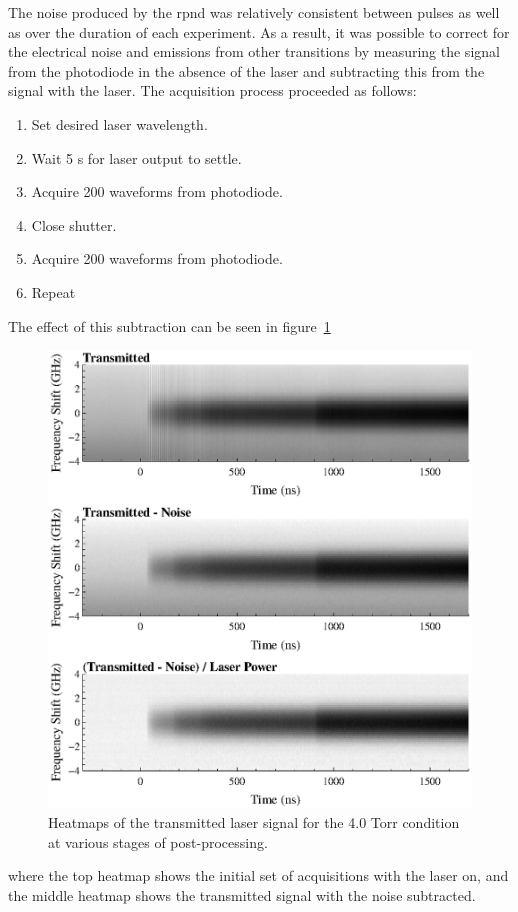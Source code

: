 The noise produced by the \acs{rpnd} was relatively consistent between pulses as
well as over the duration of each experiment. As a result, it was possible to
correct for the electrical noise and emissions from other transitions by
measuring the signal from the photodiode in the absence of the laser and
subtracting this from the signal with the laser. The acquisition process
proceeded as follows:
\begin{enumerate}
  \item Set desired laser wavelength.
  \item Wait 5 s for laser output to settle.
  \item Acquire 200 waveforms from photodiode.
  \item Close shutter.
  \item Acquire 200 waveforms from photodiode.
  \item Repeat
\end{enumerate}
The effect of this subtraction can be seen in figure~\ref{fig:contours}
\begin{figure}
  \centering
  \includegraphics{./chapters/metastables/figures/contours.eps}
  \caption{Heatmaps of the transmitted laser signal for the 4.0 Torr condition at 
  various stages of post-processing.}
  \label{fig:contours}
\end{figure}
where the top heatmap shows the initial set of acquisitions with the laser on,
and the middle heatmap shows the transmitted signal with the noise subtracted.

